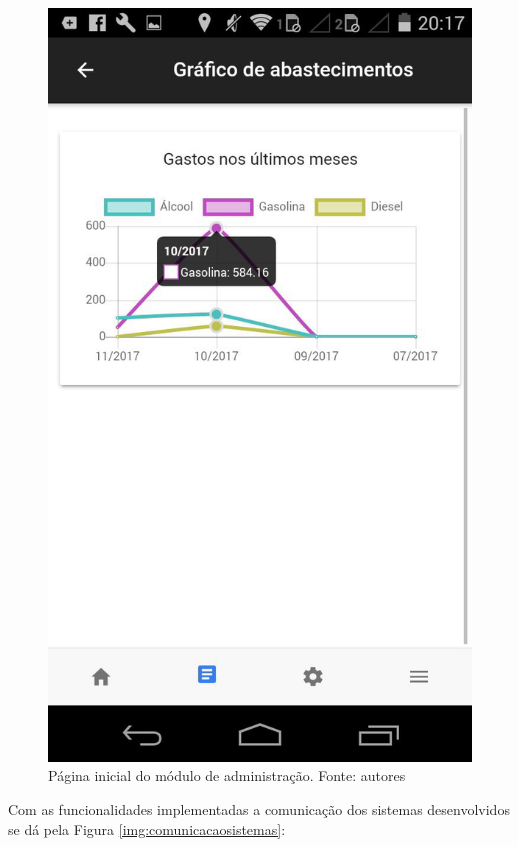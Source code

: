 \begin{figure}[H]
    \centering
    \includegraphics[scale=0.3]{figuras/grafico-app.jpg}
    \caption[Página inicial do módulo de administração]{Página inicial do módulo de administração. Fonte: autores}
    \label{img:grafico-app}
\end{figure}

Com as funcionalidades implementadas a comunicação dos sistemas desenvolvidos se dá pela Figura \ref{img:comunicacaosistemas}:

